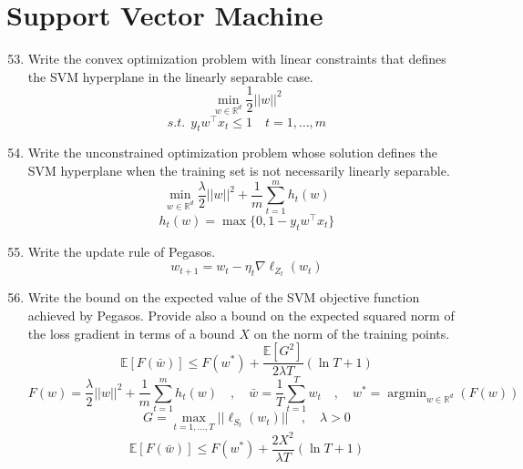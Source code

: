 \documentclass[a4paper]{article}
\newcommand{\E}{\ensuremath{\mathbb{E}}}
\newcommand{\RN}{\ensuremath{\mathbb{R}}}
\DeclareMathOperator*{\argmin}{argmin}
\begin{document}
\section{Support Vector Machine}
\begin{enumerate}
    \setcounter{enumi}{52}
    \item Write the convex optimization problem with linear constraints that defines the
        SVM hyperplane in the linearly separable case.
        $$ \min_{w\in\RN^d} \frac{1}{2}||w||^2 $$
            $$ s.t. \ \ y_tw^\top x_t\leq 1 \quad t=1,\dots,m $$
    \item Write the unconstrained optimization problem whose solution defines the SVM 
        hyperplane when the training set is not necessarily linearly separable.
        $$\min_{w\in\RN^d}\frac{\lambda}{2}||w||^2 + 
        \frac{1}{m}\sum_{t=1}^{m} h_t(w)$$
        $$ h_t(w) = \max\{0,1-y_tw^\top x_t\} $$
    \item Write the update rule of Pegasos.
        $$ w_{t+1} = w_t - \eta_t\nabla\ell_{Z_t}(w_t) $$
    \item Write the bound on the expected value of the SVM objective function achieved 
        by Pegasos. Provide also a bound on the expected squared norm of the loss gradient
        in terms of a bound $X$ on the norm of the training points.
        $$ \E[F(\bar{w})] \leq F(w^*)+\frac{\E[G^2]}{2\lambda T}(\ln{T}+1) $$
        $$ F(w) = \frac{\lambda}{2} ||w||^2 + \frac{1}{m}\sum_{t=1}^{m}h_t(w) 
        \quad ,\quad \bar{w}=\frac{1}{T}\sum_{t=1}^{T}w_t
        \quad ,\quad w^*= \argmin_{w\in\RN^d}(F(w)) $$
        $$ G=\max_{t=1,\dots,T}||\ell_{S_t}(w_t)|| \quad ,\quad \lambda>0 $$ \vspace{2em}
        $$ \E[F(\bar{w})] \leq F(w^*)+\frac{2X^2}{\lambda T}(\ln{T}+1) $$
\end{enumerate}
\end{document}
